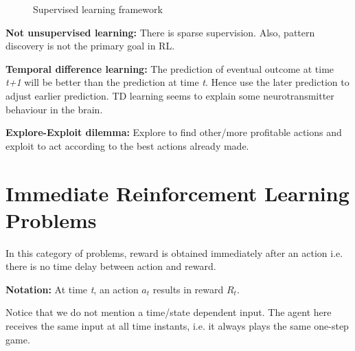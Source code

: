 \documentclass[a4paper]{article}
\begin{document}
\begin{figure}[!htbp]
\begin{center}
\end{center}
\caption{Supervised learning framework}\label{slflow}
\end{figure}

\textbf{Not unsupervised learning:} There is sparse supervision. Also, pattern discovery is not the primary goal in RL.

\textbf{Temporal difference learning:} The prediction of eventual outcome at time \textit{t+1} will be better than the prediction at time \textit{t}. Hence use the later prediction to adjust earlier prediction. TD learning seems to explain some neurotransmitter behaviour in the brain.

\textbf{Explore-Exploit dilemma:} Explore to find other/more profitable actions and exploit to act according to the best actions already made.

\section{Immediate Reinforcement Learning Problems}
In this category of problems, reward is obtained immediately after an action i.e. there is no time delay between action and reward. 

\textbf{Notation:} At time \textit{t}, an action $a_t$ results in reward $R_t$.

Notice that we do not mention a time/state dependent input. The agent here receives the same input at all time instants, i.e. it always plays the same one-step game.
\end{document}
